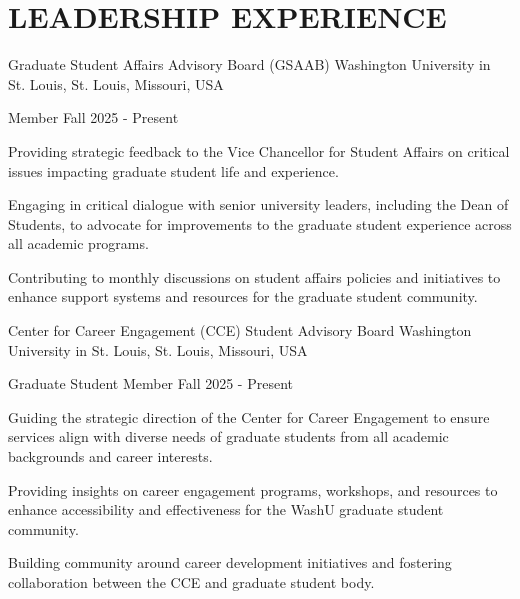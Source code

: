 \documentclass[10pt, letterpaper]{article}
\begin{document}
\section{LEADERSHIP EXPERIENCE}

\begin{leadershipentry}
  {Graduate Student Affairs Advisory Board (GSAAB)} %
  {Washington University in St. Louis, St. Louis, Missouri, USA} %
  \begin{positionentry}
    {Member} %
    {Fall 2025 - Present} %
    \item Providing strategic feedback to the Vice Chancellor for Student Affairs on critical issues impacting graduate student life and experience.
    \item Engaging in critical dialogue with senior university leaders, including the Dean of Students, to advocate for improvements to the graduate student experience across all academic programs.
    \item Contributing to monthly discussions on student affairs policies and initiatives to enhance support systems and resources for the graduate student community.
  \end{positionentry}
\end{leadershipentry}

\begin{leadershipentry}
  {Center for Career Engagement (CCE) Student Advisory Board} %
  {Washington University in St. Louis, St. Louis, Missouri, USA} %
  \begin{positionentry}
    {Graduate Student Member} %
    {Fall 2025 - Present} %
    \item Guiding the strategic direction of the Center for Career Engagement to ensure services align with diverse needs of graduate students from all academic backgrounds and career interests.
    \item Providing insights on career engagement programs, workshops, and resources to enhance accessibility and effectiveness for the WashU graduate student community.
    \item Building community around career development initiatives and fostering collaboration between the CCE and graduate student body.
  \end{positionentry}
\end{leadershipentry}
\end{document}
